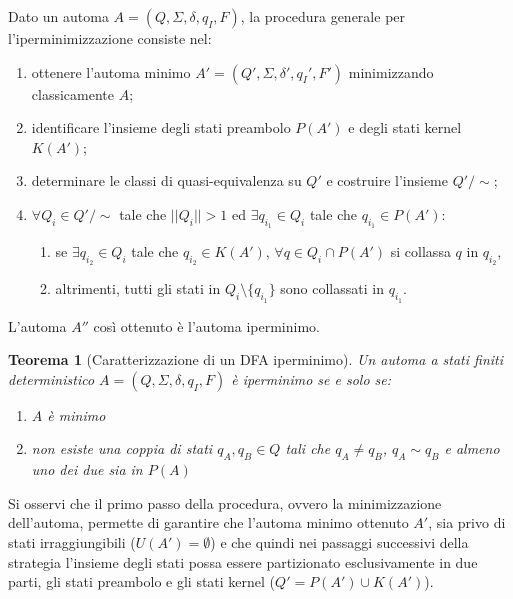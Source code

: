 \documentclass[a4paper,12pt]{report} %
\newcommand{\partitioned}[2]{#1\slash\!\!#2}  %
\newtheorem{theorem}{Teorema}[chapter]        %
\begin{document}
Dato un automa $A = (Q, \Sigma, \delta, q_I, F)$, la procedura generale per l'iperminimizzazione consiste nel:
\begin{enumerate}
  \item ottenere l'automa minimo $A' = (Q', \Sigma, \delta', q_I', F')$ minimizzando classicamente $A$;
  \item identificare l'insieme degli stati preambolo $P(A')$ e degli stati kernel $K(A')$;
  \item determinare le classi di quasi-equivalenza su $Q'$ e costruire l'insieme $\partitioned{Q'}{\sim}$;
  \item $\forall Q_i \in \partitioned{Q'}{\sim}$ tale che $||Q_i|| > 1$ ed $\exists q_{i_1} \in Q_i$ tale che $q_{i_1} \in P(A')$:
  \begin{enumerate}
    \item se $\exists q_{i_2} \in Q_i$ tale che $q_{i_2} \in K(A')$, $\forall q \in Q_i \cap P(A')$ si collassa $q$ in $q_{i_2}$,
    \item altrimenti, tutti gli stati in $Q_i \setminus \{q_{i_1}\}$ sono collassati in $q_{i_1}$.
  \end{enumerate}
\end{enumerate}

L'automa $A''$ così ottenuto è l'automa iperminimo.

\begin{theorem}[Caratterizzazione di un DFA iperminimo]
  \label{th:char-hyper-min-dfa}
  Un automa a stati finiti deterministico $A = (Q, \Sigma, \delta, q_I, F)$ è iperminimo se e solo se:
  \begin{enumerate}[label=(\alph*)]
    \item $A$ è minimo
    \item non esiste una coppia di stati $q_A, q_B \in Q$ tali che $q_A \neq q_B$, $q_A \sim q_B$ e almeno uno dei due sia in $P(A)$
  \end{enumerate}
\end{theorem}

Si osservi che il primo passo della procedura, ovvero la minimizzazione dell'automa, permette di garantire 
che l'automa minimo ottenuto $A'$, sia privo di stati irraggiungibili ($U(A') = \emptyset$) e che quindi nei passaggi
successivi della strategia l'insieme degli stati possa essere partizionato
esclusivamente in due parti, gli stati preambolo e gli stati kernel ($Q' = P(A') \cup K(A')$).
\end{document}

